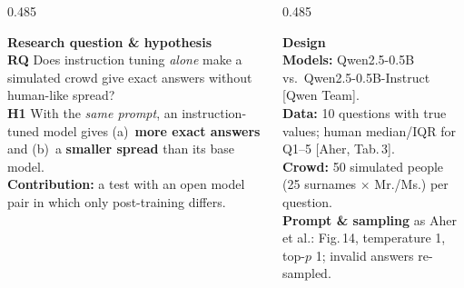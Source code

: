 \documentclass[final]{beamer}
\newcommand{\fsBody}{\fontsize{26}{32}\selectfont}
\newcommand{\fsSmall}{\fontsize{24.2}{29}\selectfont}%
\newcommand{\fsSub}{\fontsize{30}{36}\selectfont\bfseries}
\renewcommand{\cite}[1]{{\color{navy!80}[#1]}}
\begin{document}
\begin{frame}[t]
\begin{columns}[T]
\begin{column}{0.485\linewidth}
\begin{tcolorbox}[sec, title={1. Hypothesis}]
\vspace{4mm}
\begin{tcolorbox}[card]
{\fsSub\color{navy} Research question \& hypothesis}\\[2mm]
\textbf{RQ} Does instruction tuning \emph{alone} make a simulated crowd give exact answers without human-like spread?\\[2mm]
\textbf{H1} With the \emph{same prompt}, an instruction-tuned model gives
(a)~\textbf{more exact answers} and (b)~a \textbf{smaller spread} than its base model.\\[2mm]
\textbf{Contribution:} a test with an open model pair in which only post-training differs.
\end{tcolorbox}
\end{tcolorbox}

\end{column}
\begin{column}{0.485\linewidth}

\begin{tcolorbox}[sec, title={2. Methodology}]
\fsBody
\begin{tcolorbox}[card]
{\fsSub\color{navy} Design}\\[2mm]
\textbf{Models:} Qwen2.5-0.5B vs.\ Qwen2.5-0.5B-Instruct \cite{Qwen Team}.\\[1mm]
\textbf{Data:} 10 questions with true values; human median/IQR for Q1--5 \cite{Aher, Tab.\,3}.\\[1mm]
\textbf{Crowd:} 50 simulated people (25 surnames $\times$ Mr./Ms.) per question.\\[1mm]
\textbf{Prompt \& sampling} as Aher et al.: Fig.\,14, temperature 1, top-$p$ 1; invalid answers re-sampled.
\end{tcolorbox}

\vspace{4mm}
\centering
{}


\end{tcolorbox}
\end{column}
\end{columns}
\end{frame}
\end{document}
